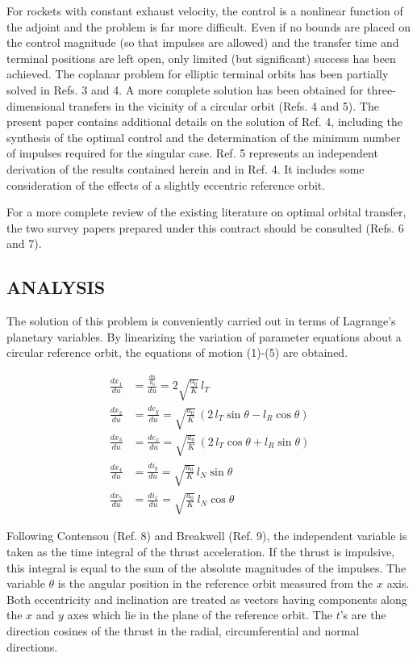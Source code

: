 \documentclass[12pt]{article}
\begin{document}
For rockets with constant exhaust velocity, the control is a nonlinear function of the adjoint and the problem is far more difficult. Even if no bounds are placed on the control magnitude (so that impulses are allowed) and the transfer time and terminal positions are left open, only limited (but significant) success has been achieved. The coplanar problem for elliptic terminal orbits has been partially solved in Refs. 3 and 4. A more complete solution has been obtained for three-dimensional transfers in the vicinity of a circular orbit (Refs. 4 and 5). The present paper contains additional details on the solution of Ref. 4, including the synthesis of the optimal control and the determination of the minimum number of impulses required for the singular case. Ref. 5 represents an independent derivation of the results contained herein and in Ref. 4. It includes some consideration of the effects of a slightly eccentric reference orbit.

For a more complete review of the existing literature on optimal orbital transfer, the two survey papers prepared under this contract should be consulted (Refs. 6 and 7).

\subsection*{ANALYSIS}
The solution of this problem is conveniently carried out in terms of Lagrange's planetary variables. By linearizing the variation of parameter equations about a circular reference orbit, the equations of motion (1)-(5) are obtained.

\begin{align}
\frac{dx_1}{du} &= \frac{\frac{da}{a_0}}{du} = 2 \sqrt{\frac{a_0}{K}} \, l_T \tag{1} \\
\frac{dx_2}{du} &= \frac{de_y}{du} = \sqrt{\frac{a_0}{K}} \, (2 \, l_T \sin \theta - l_R \cos \theta) \tag{2} \\
\frac{dx_3}{du} &= \frac{de_x}{du} =\sqrt{\frac{a_0}{K}} \, (2 \, l_T \cos \theta + l_R \sin \theta) \tag{3} \\
\frac{dx_4}{du} &= \frac{di_y}{du} = \sqrt{\frac{a_0}{K}} \, l_N \sin \theta \tag{4} \\
\frac{dx_5}{du} &= \frac{di_x}{du} = \sqrt{\frac{a_0}{K}} \, l_N \cos \theta \tag{5}
\end{align}

Following Contensou (Ref. 8) and Breakwell (Ref. 9), the independent variable is taken as the time integral of the thrust acceleration. If the thrust is impulsive, this integral is equal to the sum of the absolute magnitudes of the impulses. The variable $\theta$ is the angular position in the reference orbit measured from the $x$ axis. Both eccentricity and inclination are treated as vectors having components along the $x$ and $y$ axes which lie in the plane of the reference orbit. The $t$'s are the direction cosines of the thrust in the radial, circumferential and normal directions.
\end{document}
